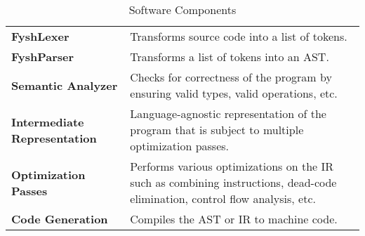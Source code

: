 \newcommand{\sw}[2]{%
	\textbf{#1} & #2 \\%
	\hline%
}
\begin{table}[H]
	\begin{tabularx}{\textwidth}{| a | x |}
		\hline
		 &  \\
		\hline
		\sw{FyshLexer}{Transforms source code into a list of tokens.}
		\sw{FyshParser}{Transforms a list of tokens into an AST.}
		\sw{Semantic Analyzer}{%
			Checks for correctness of the program by ensuring valid types, valid
			operations, etc.}
		\sw{Intermediate Representation}{%
			Language-agnostic representation of the program that is subject to
			multiple optimization passes.}
		\sw{Optimization Passes}{%
			Performs various optimizations on the IR such as combining instructions,
			dead-code elimination, control flow analysis, etc.}
		\sw{Code Generation}{Compiles the AST or IR to machine code.}
	\end{tabularx}
	\caption{Software Components}
\end{table}

